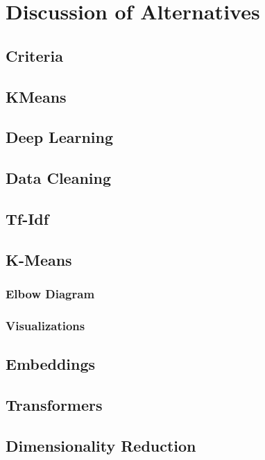 \chapter{Discussion of Alternatives}
\section{Criteria}
\section{KMeans}
\section{Deep Learning}
\section{Data Cleaning}
\section{Tf-Idf}
\section{K-Means}
\subsection{Elbow Diagram}
\subsection{Visualizations}
\section{Embeddings}
\section{Transformers}
\section{Dimensionality Reduction}